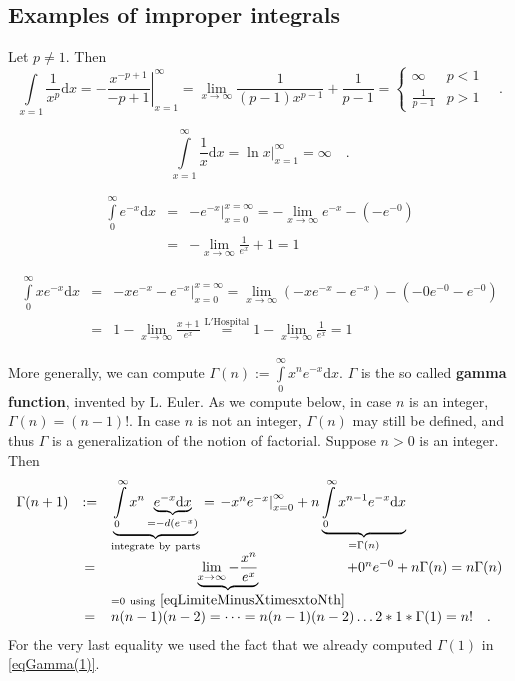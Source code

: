 \documentclass[12pt]{book}
\newcommand{\diff}{\text{d}}
\newcommand{\doublebrace}[4]{\left\{\begin{array}{ll} #1 & #2 \\#3 & #4  \end{array} \right.}
\renewcommand{\emph}{\textbf}
\begin{document}
\subsection{Examples of improper integrals}
Let $p\neq 1$. Then
\begin{equation}\label{eqIntegralxTopthPowerToInfty}
\int\limits_{x=1} \frac{1}{x^{p}} \diff x = \left.-\frac{x^{-p+1}}{-p+1}\right|_{x=1}^{\infty}= \lim\limits_{x\to\infty} 
\frac{1}{(p-1) x^{p-1}}+\frac{1}{p-1} =\doublebrace{\infty}{p<1}{\frac{1}{p-1}}{p>1} \quad . 
\end{equation}

\begin{equation}\label{eqIntegral1overxToToInfty}
\int\limits_{x=1}^{\infty} \frac{1}x \diff x= \left.\ln x \right|_{x=1}^{\infty}= \infty\quad .
\end{equation}

\begin{equation}\label{eqGamma(1)}
\begin{array}{rcl}
\int\limits_{0}^{\infty}e^{-x}\diff x&=& \left.- e^{-x}\right|_{x=0}^{x=\infty}=-\lim\limits_{x\to \infty}e^{-x}  - (-e^{-0})\\&=& -\lim \limits_{x\to \infty} \frac{1}{e^{x}} +1=1
\end{array}
\end{equation}


\[ 
\begin{array}{rcl}
\int\limits_{0}^{\infty}xe^{-x}\diff x&=& \left.-xe^{-x} - e^{-x}\right|_{x=0}^{x=\infty}=\lim\limits_{x\to \infty}\left( -xe^{-x} -e^{-x}\right) - (-0e^{-0}-e^{-0})\\&=& 1-\lim \limits_{x\to \infty} \frac{x+1}{e^{x}}\stackrel{\mathrm{L'Hospital}}{=}1-\lim \limits_{x\to \infty} \frac{1}{e^{x}} =1
\end{array}
\]

More generally, we can compute $\Gamma (n):=\displaystyle\int\limits_{0}^{\infty} x^ne^{-x}\diff x$. $\Gamma$ is the so called \emph{gamma function}, invented by L. Euler. As we compute below, in case $n$ is an integer, $\Gamma(n)=(n-1)!$. In case $n$ is not an integer, $\Gamma(n)$ may still be defined, and thus $\Gamma$ is a generalization of the notion of factorial. Suppose $n>0$ is an integer. Then
\[
\begin{array}{rcl}
\Gamma (n+1)&:=&\underbrace{\int\limits_{0}^{\infty} x^{n}\underbrace{e^{-x}\diff x}_{=-d (e^{-x})}}_{\mathrm{integrate~by~parts}}=\left. -x^{n}e^{-x}\right|_{x=0}^{\infty}+ n\underbrace{\int\limits_{0}^{\infty}x^{n-1} e^{-x}\diff x}_{=\Gamma(n)}\\
&=& \underbrace{\lim\limits_{x\to \infty} -\frac{x^{n}}{e^x}}_{=0\mathrm{~using~\eqref{eqLimiteMinusXtimesxtoNth}}}+ 0^ne^{-0}+n\Gamma(n)= n\Gamma(n)\\
&=& n(n-1)(n-2)=\dots =n(n-1)(n-2)\dots 2*1* \Gamma(1)= n!\quad .
\end{array}
\]
For the very last equality we used the fact that we already computed $\Gamma(1)$ in \eqref{eqGamma(1)}.
\end{document}
